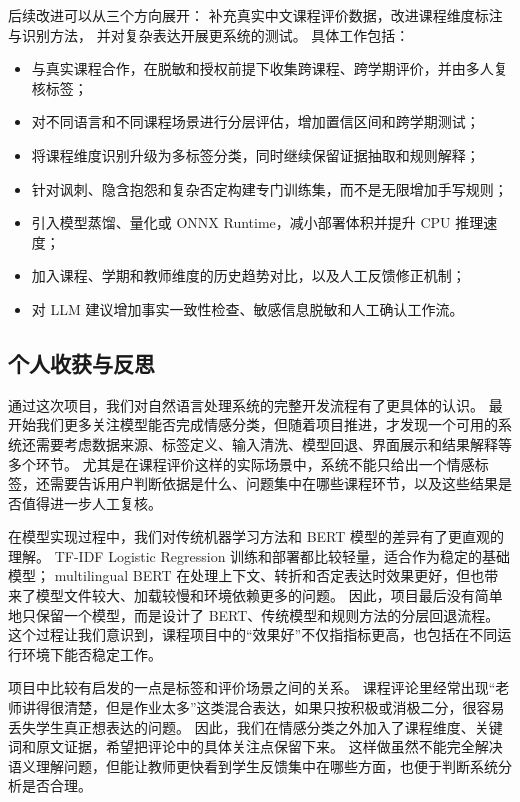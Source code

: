 后续改进可以从三个方向展开：
补充真实中文课程评价数据，改进课程维度标注与识别方法，
并对复杂表达开展更系统的测试。
具体工作包括：

\begin{itemize}
  \item 与真实课程合作，在脱敏和授权前提下收集跨课程、跨学期评价，并由多人复核标签；
  \item 对不同语言和不同课程场景进行分层评估，增加置信区间和跨学期测试；
  \item 将课程维度识别升级为多标签分类，同时继续保留证据抽取和规则解释；
  \item 针对讽刺、隐含抱怨和复杂否定构建专门训练集，而不是无限增加手写规则；
  \item 引入模型蒸馏、量化或 ONNX Runtime，减小部署体积并提升 CPU 推理速度；
  \item 加入课程、学期和教师维度的历史趋势对比，以及人工反馈修正机制；
  \item 对 LLM 建议增加事实一致性检查、敏感信息脱敏和人工确认工作流。
\end{itemize}

\subsection{个人收获与反思}

通过这次项目，我们对自然语言处理系统的完整开发流程有了更具体的认识。
最开始我们更多关注模型能否完成情感分类，但随着项目推进，才发现一个可用的系统还需要考虑数据来源、标签定义、输入清洗、模型回退、界面展示和结果解释等多个环节。
尤其是在课程评价这样的实际场景中，系统不能只给出一个情感标签，还需要告诉用户判断依据是什么、问题集中在哪些课程环节，以及这些结果是否值得进一步人工复核。

在模型实现过程中，我们对传统机器学习方法和 BERT 模型的差异有了更直观的理解。
TF-IDF Logistic Regression 训练和部署都比较轻量，适合作为稳定的基础模型；
multilingual BERT 在处理上下文、转折和否定表达时效果更好，但也带来了模型文件较大、加载较慢和环境依赖更多的问题。
因此，项目最后没有简单地只保留一个模型，而是设计了 BERT、传统模型和规则方法的分层回退流程。
这个过程让我们意识到，课程项目中的“效果好”不仅指指标更高，也包括在不同运行环境下能否稳定工作。

项目中比较有启发的一点是标签和评价场景之间的关系。
课程评论里经常出现“老师讲得很清楚，但是作业太多”这类混合表达，如果只按积极或消极二分，很容易丢失学生真正想表达的问题。
因此，我们在情感分类之外加入了课程维度、关键词和原文证据，希望把评论中的具体关注点保留下来。
这样做虽然不能完全解决语义理解问题，但能让教师更快看到学生反馈集中在哪些方面，也便于判断系统分析是否合理。


